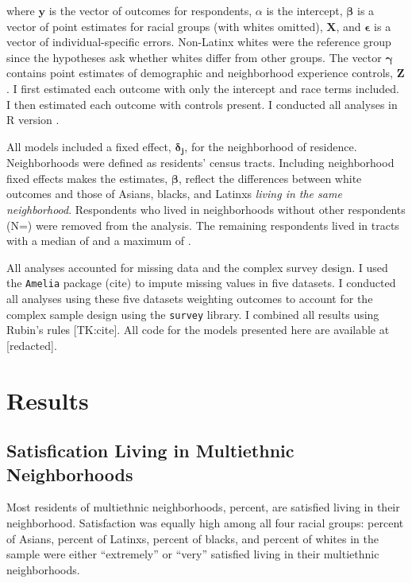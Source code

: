 \documentclass{baderart}
\begin{document}
\noindent where \(\mathbf{y}\) is the vector of outcomes for respondents, \(\alpha\) is the intercept, \(\mathbf{\beta}\) is a vector of point estimates for racial groups (with whites omitted), \(\mathbf{X}\), and \(\mathbf{\epsilon}\) is a vector of individual-specific errors. Non-Latinx whites were the reference group since the hypotheses ask whether whites differ from other groups. The vector \(\mathbf{\gamma}\) contains point estimates of demographic and neighborhood experience controls, \(\mathbf{Z}\). I first estimated each outcome with only the intercept and race terms included. I then estimated each outcome with controls present. I conducted all analyses in R version \Rversion.

All models included a fixed effect, \(\mathbf{\delta_j}\), for the neighborhood of residence. Neighborhoods were defined as residents' census tracts. Including neighborhood fixed effects makes the estimates, \(\mathbf{\beta}\), reflect the differences between white outcomes and those of Asians, blacks, and Latinxs \emph{living in the same neighborhood}. Respondents who lived in neighborhoods without other respondents (N=\oneresp) were removed from the analysis. The remaining respondents lived in tracts with a median of \medNpertract and a maximum of \maxNpertract.

All analyses accounted for missing data and the complex survey design. I used the \texttt{Amelia} package (cite) to impute missing values in five datasets. I conducted all analyses using these five datasets weighting outcomes to account for the complex sample design using the \texttt{survey} library. I combined all results using Rubin's rules {[}TK:cite{]}. All code for the models presented here are available at {[}redacted{]}.

\section{Results}\label{results}

\subsection{Satisfication Living in Multiethnic Neighborhoods}\label{satisfication-living-in-multiethnic-neighborhoods}

Most residents of multiethnic neighborhoods, \meansatisfied percent, are satisfied living in their neighborhood. Satisfaction was equally high among all four racial groups: \apisatisfied percent of Asians, \hspsatisfied percent of Latinxs, \nhbsatisfied percent of blacks, and \nhwsatisfied percent of whites in the sample were either ``extremely'' or ``very'' satisfied living in their multiethnic neighborhoods.
\end{document}
